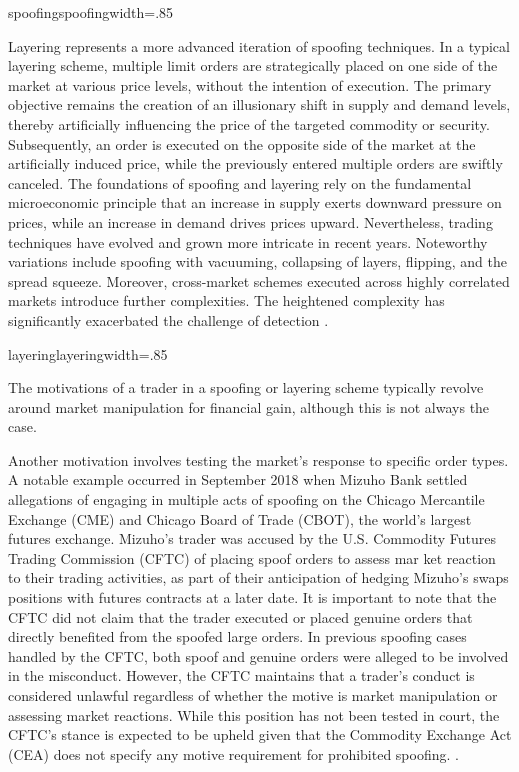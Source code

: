 {spoofing}{spoofing}{width=.85\textwidth}%

Layering represents a more advanced iteration of spoofing techniques. In a typical layering scheme, multiple limit orders
are strategically placed on one side of the market at various price levels, without the intention of execution. The primary
objective remains the creation of an illusionary shift in supply and demand levels, thereby artificially influencing
the price of the targeted commodity or security. Subsequently, an order is executed on the opposite side of the market
at the artificially induced price, while the previously entered multiple orders are swiftly canceled. The foundations of
spoofing and layering rely on the fundamental microeconomic principle that an increase in supply exerts downward pressure
on prices, while an increase in demand drives prices upward. Nevertheless, trading techniques have evolved and grown more
intricate in recent years. Noteworthy variations include spoofing with vacuuming, collapsing of layers, flipping, and the
spread squeeze. Moreover, cross-market schemes executed across highly correlated markets introduce further complexities.
The heightened complexity has significantly exacerbated the challenge of detection \cite{corcoran2020understanding,
cheung2019understanding}.

{layering}{layering}{width=.85\textwidth}%

The motivations of a trader in a spoofing or layering scheme typically revolve around market manipulation for financial
gain, although this is not always the case. 

Another motivation involves testing the market's response to specific order
types. A notable example occurred in September 2018 when Mizuho Bank settled allegations of engaging in multiple acts of
spoofing on the Chicago Mercantile Exchange (CME) and Chicago Board of Trade (CBOT), the world's largest futures exchange.
Mizuho's trader was accused by the U.S. Commodity Futures Trading Commission (CFTC) of placing spoof orders to assess mar
ket reaction to their trading activities, as part of their anticipation of hedging Mizuho's swaps positions with futures
contracts at a later date. It is important to note that the CFTC did not claim that the trader executed or placed genuine
orders that directly benefited from the spoofed large orders. In previous spoofing cases handled by the CFTC, both spoof
and genuine orders were alleged to be involved in the misconduct. However, the CFTC maintains that a trader's conduct is
considered unlawful regardless of whether the motive is market manipulation or assessing market reactions. While this
position has not been tested in court, the CFTC's stance is expected to be upheld given that the Commodity Exchange Act
(CEA) does not specify any motive requirement for prohibited spoofing. \cite{cftc2018mizuho, lu2021individual,
schultz2019spoofing}.

